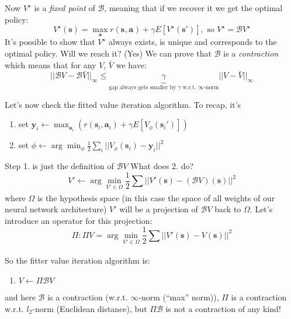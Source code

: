 \documentclass{report}
\newcommand{\argmin}{\arg\!\min}
\begin{document}
Now $V^\star$ is a \textit{fixed point} of $\mathcal{B}$, 
meaning that if we recover it we get the optimal policy:
\begin{equation}
		V^\star(\bm{s}) = \max_{\bm{a}} r(\bm{s}_{}, \bm{a}_{}) + \gamma E[V^\star(\bm{s}')], \text{ so } V^\star = \mathcal{B}V^\star
\end{equation}
It's possible to show that $V^\star$ always exists, is unique and corresponds to the optimal policy.
Will we reach it? (Yes)
We can prove that $\mathcal{B}$ is a \textit{contraction} which means that for any $V$, $\bar{V}$ we have:
\begin{equation}
		|| \mathcal{B}V - \mathcal{B}\bar{V}||_\infty \leq \underbrace{\gamma}_{\text{gap always gets smaller by } \gamma \text{ w.r.t. } \infty \text{-norm}} || V - \bar{V}||_\infty
\end{equation}

Let's now check the fitted value iteration algorithm.
To recap, it's
\begin{enumerate}
		\item set $ \bm{y}_i \leftarrow \max_{\bm{a}_i} \left( r (\bm{s}_{i}, \bm{a}_{i}) + \gamma E \left[ V_\phi (\bm{s}_i')  \right]  \right)     $ 
		\item set $ \phi \leftarrow \argmin_\phi \frac{1}{2} \sum_{i}^{} ||   V_\phi (\bm{s}_i)  - \bm{y}_i ||^2 $
\end{enumerate}
Step 1. is just the definition of $\mathcal{B}V$
What does 2. do?
\begin{equation}
		V' \leftarrow \argmin_{V' \in \Omega} \frac{1}{2} \sum_{}^{} ||V'(\bm{s}) - (\mathcal{B}V)(\bm{s})||^2
\end{equation}
where $\Omega$ is the hypothesis space (in this case the space of all weights of our neural network architecture)
$V'$ will be a projection of $\mathcal{B}V$ back to $\Omega$.
Let's introduce an operator for this projection:
\begin{equation}
		\Pi : \Pi V = \argmin_{V' \in \Omega} \frac{1}{2} \sum_{}^{} ||V'(\bm{s}) - V(\bm{s})||^2
\end{equation}

So the fitter value iteration algorithm is:
\begin{enumerate}
		\item $V \leftarrow \Pi \mathcal{B} V$
\end{enumerate}
and here $\mathcal{B}$ is a contraction (w.r.t. $\infty$-norm (``max'' norm)),
$\Pi$ is a contraction w.r.t. $l_2$-norm (Euclidean distance), but
$\Pi \mathcal{B}$ is not a contraction of any kind!
\end{document}
